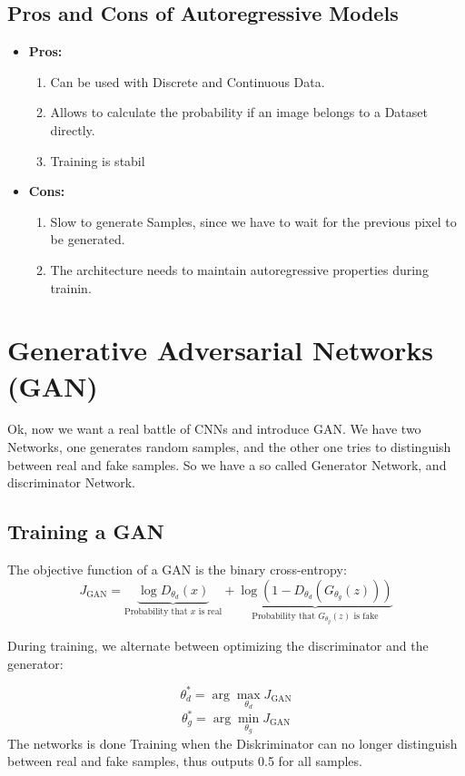 \documentclass[a4paper]{article}
\begin{document}
    \subsection{Pros and Cons of Autoregressive Models}
    \begin{itemize}
        \item \textbf{Pros:}
        \begin{enumerate}
            \item Can be used with Discrete and Continuous Data.
            \item Allows to calculate the probability if an image belongs to a Dataset directly. 
            \item Training is stabil
        \end{enumerate}
        \item \textbf{Cons:}
         \begin{enumerate}
            \item Slow to generate Samples, since we have to wait for the previous pixel to be generated. 
            \item The architecture needs to maintain autoregressive properties during trainin. 
            \end{enumerate}
    \end{itemize}
\section{Generative Adversarial Networks (GAN)}
Ok, now we want a real battle of CNNs and introduce GAN. We have two Networks, one generates random samples, and the other one tries to distinguish between real and fake samples.  So we have a so called Generator Network, and discriminator Network. 
\subsection{Training a GAN}


The objective function of a GAN is the binary cross-entropy:
\[
J_{\text{GAN}} = \underbrace{\log D_{\theta_d}(x)}_{\text{Probability that } x \text{ is real}} + \underbrace{\log(1 - D_{\theta_d}(G_{\theta_g}(z)))}_{\text{Probability that } G_{\theta_g}(z) \text{ is fake}}
\]

During training, we alternate between optimizing the discriminator and the generator:

\[
\theta_d^* = \arg \max_{\theta_d} J_{\text{GAN}}
\]
\[
\theta_g^* = \arg \min_{\theta_g} J_{\text{GAN}}
\]
The networks is done Training when the Diskriminator can no longer distinguish between real and fake samples, thus outputs 0.5 for all samples.
\end{document}
